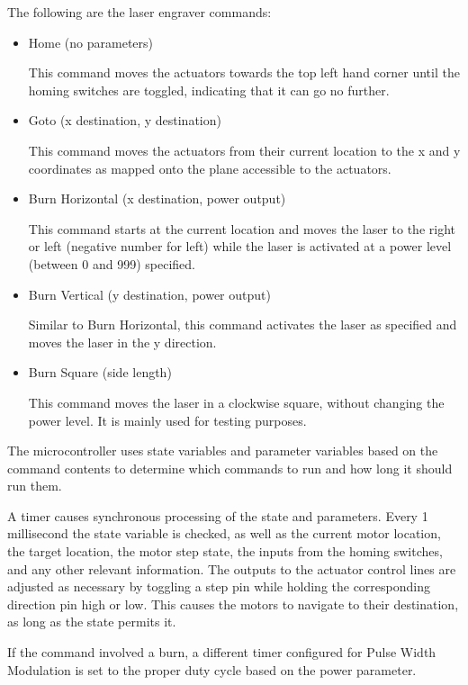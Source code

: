 \documentclass[11pt]{LaTeX-Classes/math-hw}
\begin{document}
The following are the laser engraver commands:
\begin{itemize}
  \item Home (no parameters)

    This command moves the actuators towards the top left hand corner until the homing switches
    are toggled, indicating that it can go no further.

  \item Goto (x destination, y destination)
    
    This command moves the actuators from their current location to the x and y coordinates
    as mapped onto the plane accessible to the actuators.

  \item Burn Horizontal (x destination, power output)

    This command starts at the current location and moves the laser to the right or left (negative number for left)
    while the laser is activated at a power level (between 0 and 999) specified.

  \item Burn Vertical (y destination, power output)
    
    Similar to Burn Horizontal, this command activates the laser as specified and moves the laser in the
    y direction.

  \item Burn Square (side length)

    This command moves the laser in a clockwise square, without changing the power level. It is
    mainly used for testing purposes.
\end{itemize}

The microcontroller uses state variables and parameter variables based on the command contents to determine which commands
to run and how long it should run them.

A timer causes synchronous processing of the state and parameters. Every 1 millisecond
the state variable is checked, as well as the current motor location, the target location,
the motor step state, the inputs from the homing switches, and any other relevant information.
The outputs to the actuator control lines are adjusted as necessary by toggling a step pin while
holding the corresponding direction pin high or low.
This causes the motors to navigate to their destination, as long as the state permits it.

If the command involved a burn, a different timer configured for Pulse Width Modulation is set
to the proper duty cycle based on the power parameter.
\end{document}
